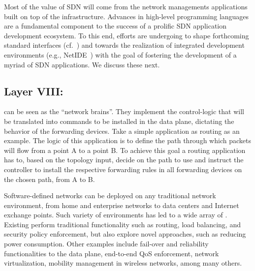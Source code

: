 Most of the value of SDN will come from the network managements applications built on top of the infrastructure.
Advances in high-level programming languages are a fundamental component to the success of a prolific SDN 
application development ecosystem. To this end, efforts are undergoing to shape forthcoming standard 
interfaces (cf.~\cite{kuzniar2013}) and towards the realization of integrated development 
environments (e.g., NetIDE~\cite{facca2013}) with the goal of fostering the development of a myriad of SDN applications.
We discuss these next.

\subsection{Layer VIII: \ManaApps}

\Manaaapps can be seen as the ``network brains''. 
They implement the control-logic that will be translated into commands to be installed in the data plane, dictating the behavior of the forwarding devices.
Take a simple application as routing as an example. 
The logic of this application is to define the path through which packets will flow from 
a point A to a point B.
To achieve this goal a routing application has to, based on the topology input, decide on the path to use and instruct the controller to install the 
respective forwarding rules in all forwarding devices on the chosen path, from A to B.

Software-defined networks can be deployed on any traditional network environment, from home and enterprise networks to data centers and Internet exchange points.
Such variety of environments has led to a wide array of \manapps.
Existing \manapps perform traditional functionality such as routing, load balancing, and security policy enforcement, but also explore novel approaches, such as reducing power consumption. 
Other examples include fail-over and reliability functionalities to the data plane, end-to-end QoS enforcement, network virtualization, mobility management in wireless networks, among many others.

